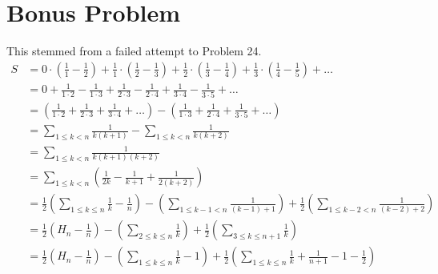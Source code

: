 \section*{Bonus Problem}
This stemmed from a failed attempt to Problem 24.
\begin{align*}
    S & = 0\cdot\left(\frac{1}{1} - \frac{1}{2}\right) + \frac{1}{1}\cdot\left(\frac{1}{2} - \frac{1}{3}\right) + \frac{1}{2}\cdot\left(\frac{1}{3} - \frac{1}{4}\right)+\frac{1}{3}\cdot\left(\frac{1}{4} - \frac{1}{5}\right) + \ldots \\
      & = 0 + \frac{1}{1\cdot 2} - \frac{1}{1\cdot 3} + \frac{1}{2\cdot 3} - \frac{1}{2\cdot 4} + \frac{1}{3\cdot 4} - \frac{1}{3\cdot 5} + \ldots                                                                                       \\
      & = \left(\frac{1}{1\cdot 2}+ \frac{1}{2\cdot 3}+ \frac{1}{3\cdot 4} + \ldots\right) - \left(\frac{1}{1\cdot 3} +\frac{1}{2\cdot 4} +\frac{1}{3\cdot 5} + \ldots \right)                                                           \\
      & =\sum_{1 \leq k < n} \frac{1}{k(k+1)} - \sum_{1 \leq k < n} \frac{1}{k(k+2)}                                                                                                                                                     \\
      & =\sum_{1 \leq k < n}\frac{1}{k(k+1)(k+2)}                                                                                                                                                                                        \\
      & =\sum_{1 \leq k < n}\left(\frac{1}{2k}-\frac{1}{k+1} + \frac{1}{2(k+2)}\right)                                                                                                                                                   \\
      & =\frac{1}{2}\left(\sum_{1 \leq k \leq n}\frac{1}{k} - \frac{1}{n}\right) - \left(\sum_{1 \leq k-1 < n}\frac{1}{(k-1)+1}\right) + \frac{1}{2}\left(\sum_{1 \leq k-2 < n}\frac{1}{(k-2)+2}\right)                                  \\
      & =\frac{1}{2}\left(H_n - \frac{1}{n}\right) - \left(\sum_{2 \leq k \leq n}\frac{1}{k}\right) + \frac{1}{2}\left(\sum_{3 \leq k \leq n+1}\frac{1}{k}\right)                                                                        \\
      & =\frac{1}{2}\left(H_n - \frac{1}{n}\right) - \left(\sum_{1 \leq k \leq n}\frac{1}{k}-1\right) + \frac{1}{2}\left(\sum_{1 \leq k \leq n}\frac{1}{k} + \frac{1}{n+1} - 1 - \frac{1}{2}\right)                                      \\

\end{align*}
